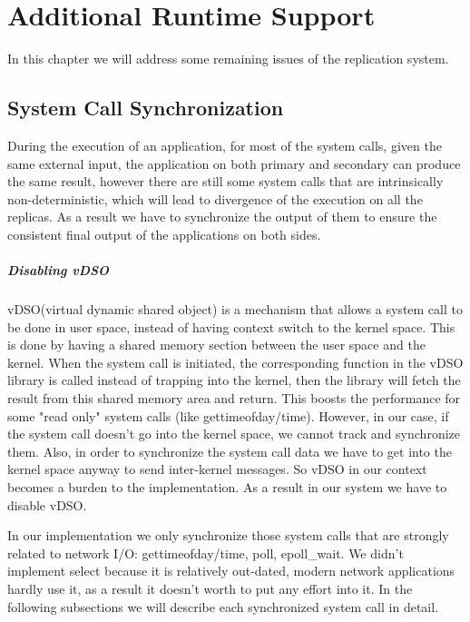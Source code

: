 \chapter{Additional Runtime Support}
In this chapter we will address some remaining issues of the replication system.

\section{System Call Synchronization}
During the execution of an application, for most of the system calls, given the same external input, the application on both primary and secondary can produce the same result, however there are still some system calls that are intrinsically non-deterministic, which will lead to divergence of the execution on all the replicas. As a result we have to synchronize the output of them to ensure the consistent final output of the applications on both sides.

\paragraph{Disabling vDSO}

vDSO(virtual dynamic shared object) is a mechanism that allows a system call to be done in user space, instead of having context switch to the kernel space. This is done by having a shared memory section between the user space and the kernel. When the system call is initiated, the corresponding function in the vDSO library is called instead of trapping into the kernel, then the library will fetch the result from this shared memory area and return. This boosts the performance for some "read only" system calls (like gettimeofday/time). However, in our case, if the system call doesn't go into the kernel space, we cannot track and synchronize them. Also, in order to synchronize the system call data we have to get into the kernel space anyway to send inter-kernel messages. So vDSO in our context becomes a burden to the implementation. As a result in our system we have to disable vDSO.

In our implementation we only synchronize those system calls that are strongly related to network I/O: gettimeofday/time, poll, epoll\_wait. We didn't implement select because it is relatively out-dated, modern network applications hardly use it, as a result it doesn't worth to put any effort into it. In the following subsections we will describe each synchronized system call in detail. 

